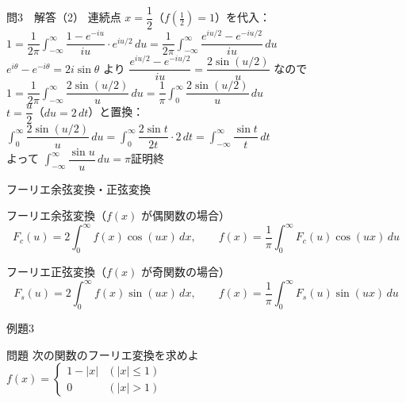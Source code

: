 \documentclass[professionalfonts]{beamer}
\begin{document}
\begin{frame}{問3　解答（2）}
  連続点 $x=\dfrac{1}{2}$（$f\!\left(\tfrac{1}{2}\right)=1$）を代入：\\[1pt]
  $1 = \dfrac{1}{2\pi}\displaystyle\int_{-\infty}^{\infty}
    \dfrac{1-e^{-iu}}{iu}\cdot e^{iu/2}\,du
    = \dfrac{1}{2\pi}\int_{-\infty}^{\infty}
    \dfrac{e^{iu/2}-e^{-iu/2}}{iu}\,du$\\[2pt]
  $e^{i\theta}-e^{-i\theta}=2i\sin\theta$ より
  $\dfrac{e^{iu/2}-e^{-iu/2}}{iu} = \dfrac{2\sin(u/2)}{u}$ なので\\[1pt]
  $1 = \dfrac{1}{2\pi}\displaystyle\int_{-\infty}^{\infty}\dfrac{2\sin(u/2)}{u}\,du
    = \dfrac{1}{\pi}\int_{0}^{\infty}\dfrac{2\sin(u/2)}{u}\,du$\\[1pt]
  $t=\dfrac{u}{2}$（$du=2\,dt$）と置換：
  $\displaystyle\int_{0}^{\infty}\dfrac{2\sin(u/2)}{u}\,du
    = \int_{0}^{\infty}\dfrac{2\sin t}{2t}\cdot 2\,dt
    = \int_{-\infty}^{\infty}\dfrac{\sin t}{t}\,dt$\\[1pt]
  よって $\displaystyle\int_{-\infty}^{\infty}\dfrac{\sin u}{u}\,du = \pi$\hfill 証明終
\end{frame}

\begin{frame}{フーリエ余弦変換・正弦変換}
  \begin{block}{フーリエ余弦変換（$f(x)$ が偶関数の場合）}
  \[
    F_c(u) = 2\int_{0}^{\infty} f(x)\cos(ux)\,dx, \qquad
    f(x) = \frac{1}{\pi}\int_{0}^{\infty} F_c(u)\cos(ux)\,du
  \]
  \end{block}
  \begin{block}{フーリエ正弦変換（$f(x)$ が奇関数の場合）}
  \[
    F_s(u) = 2\int_{0}^{\infty} f(x)\sin(ux)\,dx, \qquad
    f(x) = \frac{1}{\pi}\int_{0}^{\infty} F_s(u)\sin(ux)\,du
  \]
  \end{block}
\end{frame}

\begin{frame}{例題3　}
  \begin{exampleblock}{問題}
    次の関数のフーリエ変換を求めよ\\[2pt]
    $f(x) = \begin{cases} 1-|x| & (|x| \leq 1) \\ 0 & (|x| > 1) \end{cases}$\\[2pt]
  \end{exampleblock}
\end{frame}
\end{document}
